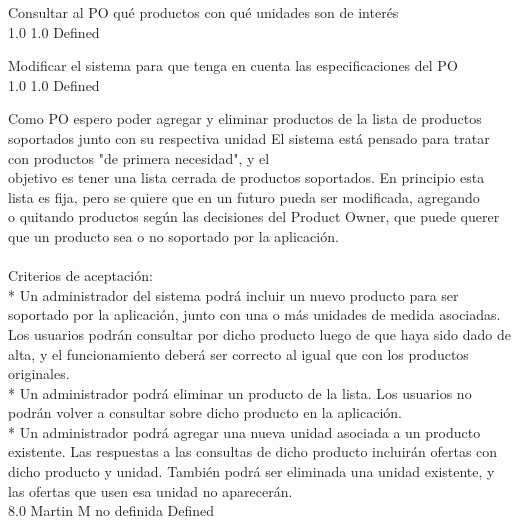 		{Consultar al PO qué productos con qué unidades son de interés} %
		{\\
} %
		{1.0} %
		{} %
		{1.0} %
		{Defined} %

		{Modificar el sistema para que tenga en cuenta las especificaciones del PO} %
		{\\
} %
		{1.0} %
		{} %
		{1.0} %
		{Defined} %


\vspace{20pt}

	{Como PO espero poder agregar y eliminar productos de la lista de productos soportados junto con su respectiva unidad} %
	{El sistema está pensado para tratar con productos "de primera necesidad", y el\\
objetivo es tener una lista cerrada de productos soportados. En principio esta\\
lista es fija, pero se quiere que en un futuro pueda ser modificada, agregando\\
o quitando productos según las decisiones del Product Owner, que puede querer\\
que un producto sea o no soportado por la aplicación.\\
  \\
Criterios de aceptación:\\
* Un administrador del sistema podrá incluir un nuevo producto para ser soportado por la aplicación, junto con una o más unidades de medida asociadas. Los usuarios podrán consultar por dicho producto luego de que haya sido dado de alta, y el funcionamiento deberá ser correcto al igual que con los productos originales.  \\
* Un administrador podrá eliminar un producto de la lista. Los usuarios no podrán volver a consultar sobre dicho producto en la aplicación.  \\
* Un administrador podrá agregar una nueva unidad asociada a un producto existente. Las respuestas a las consultas de dicho producto incluirán ofertas con dicho producto y unidad. También podrá ser eliminada una unidad existente, y las ofertas que usen esa unidad no aparecerán.\\
} %
	{} %
	{8.0} %
	{Martin M} %
	{no definida} %
	{Defined} %


